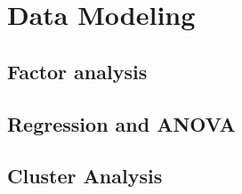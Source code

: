 \section{Data Modeling}
\subsection{Factor analysis}
\subsection{Regression and ANOVA}
\subsection{Cluster Analysis}
\endinput